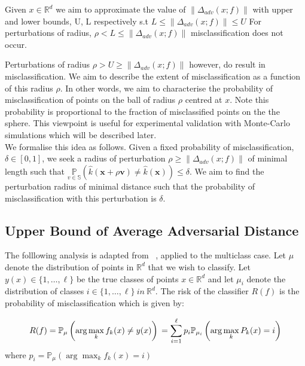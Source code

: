 \documentclass[a4paper,singlecolumn,12pt]{article}
\begin{document}
Given $x\in\mathbb{R}^{d}$ we aim to approximate the value of  $\|\Delta_{adv}(x;f)\|$ with upper and lower bounds, U, L respectively s.t $L \leq  \|\Delta_{adv}(x;f)\| \leq U$ For perturbations of radius, $\rho < L \leq \|\Delta_{adv}(x;f)\|$  misclassification does not occur. \\

\par
\par
Perturbations of radius $\rho > U \geq \|\Delta_{adv}(x;f)\| $ however, do result in misclassification. We aim to describe the extent of misclassification as a function of this radius $\rho$. In other words, we aim to characterise the probability of misclassification of points on the ball of radius $\rho$ centred at $x$. Note this probability is proportional to the fraction of misclassified points on the the sphere. This viewpoint is useful for experimental validation with Monte-Carlo simulations which will be described later. \\

We formalise this idea as follows. Given a fixed probability of misclassification, $\delta \in [0,1]$, we seek a radius of perturbation $\rho\geq \|\Delta_{adv}(x;f)\|$ of minimal length such that $\underset{v \in \mathbb{S}}{\mathbb{P}}(\hat{k}(\boldsymbol{x}+\rho\boldsymbol{v})\neq\hat{k}(\boldsymbol{x}))\leq \delta$. We aim to find the perturbation radius of minimal distance such that the probability of misclassification with this perturbation is $\delta$.
\par 

\subsection{Upper Bound of Average Adversarial Distance}
The folllowing analysis is adapted from ~\cite{fawzi2016analysis}, applied to the multiclass case. Let $\mu$ denote the distribution of points in $\mathbb{R}^{d}$ that we wish to classify. Let $y(x)\in\{1, \ldots, \ell\}$ be the true classes of points $x\in\mathbb{R}^{d}$ and let $\mu_{i}$ denote the distribution of classes $i \in\{1, \ldots, \ell\}\ in\ \mathbb{R}^{d}$. The risk of the classifier $R(f)$ is the probability of misclassification which is given by:

$$ R(f) =\mathbb{P}_{\mu}\left(\arg \max _{k} f_{k}(x) \neq y(x)\right) \\
=\sum_{i=1}^{\ell} p_{i} \mathbb{P}_{\mu_{i}}\left(\arg \max _{k} P_{k}(x)=i\right)$$
where $p_{i}=\mathbb{P}_{\mu}\left(\arg \max _{k} f_{k}(x)=i\right)$
\end{document}
